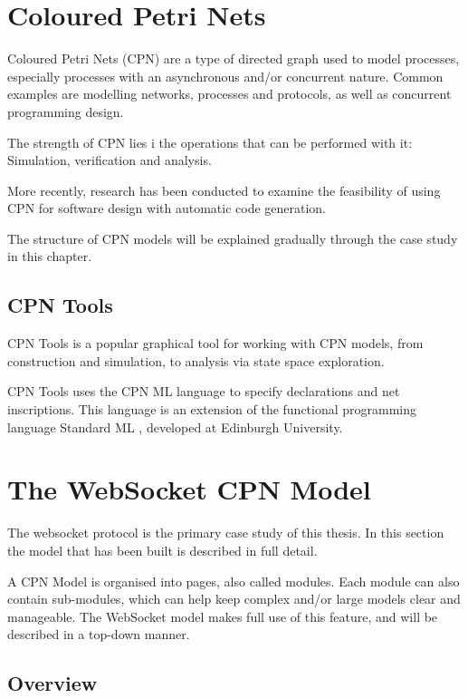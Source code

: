 \section{Coloured Petri Nets}

Coloured Petri Nets (CPN) are a type of directed graph used to model processes,
especially processes with an asynchronous and/or concurrent nature. Common
examples are modelling networks, processes and protocols, as well as
concurrent programming design.

The strength of CPN lies i the operations that can be performed with it:
Simulation, verification and analysis. 

More recently, research has been conducted to examine the feasibility of using
CPN for software design with automatic code generation.

The structure of CPN models will be explained gradually through the case study
in this chapter.

\subsection{CPN Tools}

CPN Tools \cite{cpntools} is a popular graphical
tool for working with CPN models, from construction and simulation, to analysis
via state space exploration.

	CPN Tools uses the CPN ML language to specify declarations and net inscriptions.
	This language is an extension of the functional programming language Standard
	ML \cite{milner1997definition}, developed at Edinburgh University.
	
\section{The WebSocket CPN Model}

The websocket protocol is the primary case study of this thesis. 
In this section the model that has been built is described in full detail. 

A CPN Model is organised into pages, also called modules. Each module can also
contain sub-modules, which can help keep complex and/or large models clear and
manageable. The WebSocket model makes full use of this feature, and will be
described in a top-down manner.

\subsection{Overview}


